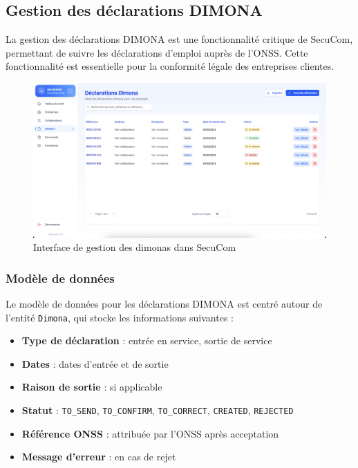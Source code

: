 \subsection{Gestion des déclarations DIMONA}

La gestion des déclarations DIMONA est une fonctionnalité critique de SecuCom, permettant de suivre les déclarations d'emploi auprès de l'ONSS. Cette fonctionnalité est essentielle pour la conformité légale des entreprises clientes.

\vspace{0.5cm}

\begin{figure}[H]
  \centering
  \includegraphics[width=1\textwidth]{SecuComPreviewDimona.png}
  \caption{Interface de gestion des dimonas dans SecuCom}
  \label{fig:companyInterface}
\end{figure}

\subsubsection{Modèle de données}

Le modèle de données pour les déclarations DIMONA est centré autour de l'entité \texttt{Dimona}, qui stocke les informations suivantes :

\vspace{0.5cm}

\begin{itemize}[leftmargin=*,label=\textcolor{darkgray}{$\bullet$},itemsep=0.3em]
  \item \textbf{Type de déclaration} : entrée en service, sortie de service
  \item \textbf{Dates} : dates d'entrée et de sortie
  \item \textbf{Raison de sortie} : si applicable
  \item \textbf{Statut} : \texttt{TO\_SEND}, \texttt{TO\_CONFIRM}, \texttt{TO\_CORRECT}, \texttt{CREATED}, \texttt{REJECTED}
  \item \textbf{Référence ONSS} : attribuée par l'ONSS après acceptation
  \item \textbf{Message d'erreur} : en cas de rejet
\end{itemize}

